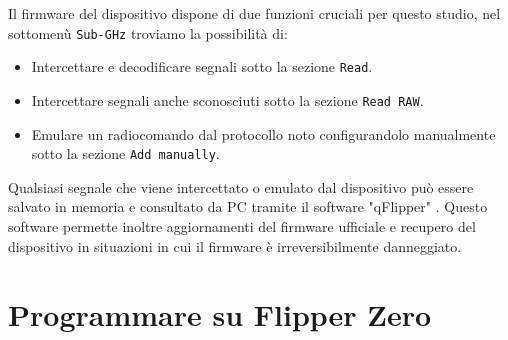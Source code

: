 Il firmware del dispositivo dispone di due funzioni cruciali per questo studio, nel sottomenù \texttt{Sub-GHz} troviamo la possibilità di:
\begin{itemize}
  \item Intercettare e decodificare segnali sotto la sezione \texttt{Read}.
  \item Intercettare segnali anche sconosciuti sotto la sezione \texttt{Read RAW}.
  \item Emulare un radiocomando dal protocollo noto configurandolo manualmente sotto la sezione \texttt{Add manually}.
\end{itemize}
Qualsiasi segnale che viene intercettato o emulato dal dispositivo può essere salvato in memoria e consultato da PC tramite il software "qFlipper" \cite{qflipper}. Questo software permette inoltre aggiornamenti del firmware ufficiale e recupero del dispositivo in situazioni in cui il firmware è irreversibilmente danneggiato.

\section{Programmare su Flipper Zero}
\label{sec:flip_prog}

